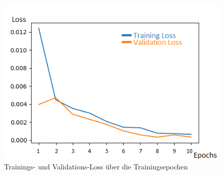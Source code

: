 \begin{figure}[!htb] 
  \centering
  \includegraphics[width=13.8cm]{Abb/training_progress.png}
  \caption{Trainings- und Validations-Loss über die Trainingsepochen}
  \label{lossbild}
\end{figure} 
 \label{pred_boxes}
